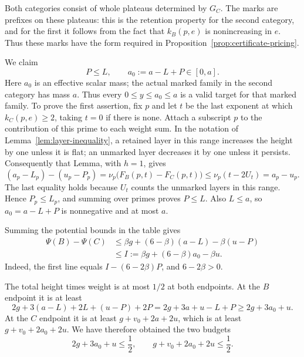 Both categories consist of whole plateaus determined by \(G_C\). The
marks are prefixes on these plateaus: this is the retention property
for the second category, and for the first it follows from the fact
that \(k_B(p,e)\) is nonincreasing in \(e\). Thus these marks have the
form required in Proposition~\ref{prop:certificate-pricing}.

We claim
\begin{equation}\label{eq:flat-compensation}
 P\le L,\qquad a_0:=a-L+P\in[0,a].
\end{equation}
Here \(a_0\) is an effective scalar mass; the actual marked family in
the second category has mass \(a\). Thus every \(0\le y\le a_0\le a\) is a
valid target for that marked family.
To prove the first assertion, fix \(p\) and let \(t\) be the last
exponent at which \(k_C(p,e)\ge2\), taking \(t=0\) if there is none.
Attach a subscript \(p\) to the contribution of this prime to each
weight sum. In the notation of Lemma~\ref{lem:layer-inequality}, a
retained layer in this range increases the height by one unless it is
flat; an unmarked layer decreases it by one unless it persists.
Consequently that Lemma, with \(h=1\), gives
\[
 (a_p-L_p)-(u_p-P_p)
 =\nu_p\bigl(F_B(p,t)-F_C(p,t)\bigr)
 \le \nu_p(t-2U_t)=a_p-u_p.
\]
The last equality holds because \(U_t\) counts the unmarked layers
in this range. Hence \(P_p\le L_p\), and summing over primes proves
\(P\le L\). Also \(L\le a\), so \(a_0=a-L+P\) is nonnegative and at
most \(a\).

Summing the potential bounds in the table gives
\begin{equation}\label{eq:potential-increment}
 \begin{aligned}
 \Psi(B)-\Psi(C)
 &\le \beta g+(6-\beta)(a-L)-\beta(u-P)\\
 &\le I:=\beta g+(6-\beta)a_0-\beta u.
 \end{aligned}
\end{equation}
Indeed, the first line equals \(I-(6-2\beta)P\), and \(6-2\beta>0\).

The total height times weight is at most \(1/2\) at both endpoints.
At the \(B\) endpoint it is at least
\[
 2g+3(a-L)+2L+(u-P)+2P
 =2g+3a+u-L+P
 \ge 2g+3a_0+u.
\]
At the \(C\) endpoint it is at least
\(g+v_0+2a+2u\), which is at least \(g+v_0+2a_0+2u\).
We have therefore obtained the two budgets
\begin{equation}\label{eq:potential-budgets}
 2g+3a_0+u\le\frac12,\qquad
 g+v_0+2a_0+2u\le\frac12.
\end{equation}

